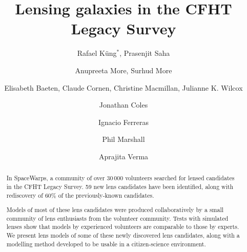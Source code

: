 \documentclass{ws-procs975x65}
\begin{document}
\title{Lensing galaxies in the CFHT Legacy Survey}

\author{
  Rafael K\"ung$^*$, Prasenjit Saha
}
\address{
Physik-Institut, University of Zurich,\\
Winterthurerstrasse 190, 8057 Zurich, Switzerland\\
$^*$E-mail: rafael\_kueng@uzh.ch
}
\author{
  Anupreeta More, Surhud More
}
\address{
  Kavli Institute for the Physics and Mathematics of the Universe, University of Tokyo\\ 5-1-5 Kashiwanoha, Kashiwa-shi 277-8583, Japan
}

\author{
  Elisabeth Baeten, Claude Cornen, Christine Macmillan, Julianne K. Wilcox
}
\address{
  Zooniverse, c/o Astrophysics Department, University of Oxford\\
  Oxford OX1 3RH, UK
}

\author{
  Jonathan Coles
}
\address{
  Exascale Research Computing Lab, Campus Teratec,\\
  2 Rue de la Piquetterie, 91680 Bruyeres-le-Chatel, France
}

\author{Ignacio Ferreras}
\address{Mullard Space Science Laboratory, University College London, Holmbury St Mary, Dorking, Surrey RH5 6NT, UK}

\author{
  Phil Marshall
}
\address{
  Kavli Institute for Particle Astrophysics and Cosmology, Stanford University\\
  452 Lomita Mall, Stanford, CA 94035, USA
}

\author{
  Aprajita Verma
}
\address{
  Sub-department of Astrophysics, University of Oxford, Denys Wilkinson Building\\
  Keble Road, Oxford, OX1 3RH, UK
}






\begin{abstract}
In SpaceWarps, a community of over 30\,000 %
volunteers searched for lensed candidates in the CFHT Legacy Survey.
59 new lens candidates have been identified, along with rediscovery of 60\% of the previously-known candidates.

Models of most of these lens candidates were produced collaboratively by a small community of lens enthusiasts from the volunteer community.
Tests with simulated lenses show that models by experienced volunteers are comparable to those by experts.
We present lens models of some of these newly discovered lens candidates, along with a modelling method developed to be usable in a citizen-science environment.
\end{abstract}
\end{document}
